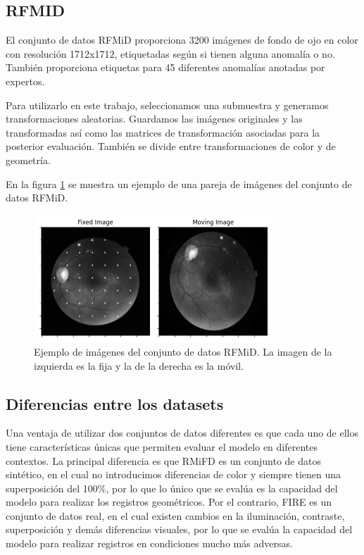 \subsection{RFMID}\label{subsec:RFMID}

El conjunto de datos RFMiD \cite{RFMiD} proporciona 3200 imágenes de fondo de ojo en color con resolución 1712x1712, etiquetadas según si tienen alguna anomalía o no.
También proporciona etiquetas para 45 diferentes anomalías anotadas por expertos.

Para utilizarlo en este trabajo, seleccionamos una submuestra y generamos transformaciones aleatorias. Guardamos las imágenes originales y las transformadas así como las matrices de transformación asociadas para la posterior evaluación.
También se divide entre transformaciones de color y de geometría.

En la figura \ref{fig:rfmid_ej} se muestra un ejemplo de una pareja de imágenes del conjunto de datos RFMiD.

\begin{figure}[tbp]
    \centering
    \includegraphics[width=0.8\textwidth]{imaxes/rfmid_ej.png}
    \caption{Ejemplo de imágenes del conjunto de datos RFMiD. La imagen de la izquierda es la fija y la de la derecha es la móvil.}
    \label{fig:rfmid_ej} 
\end{figure} 

\subsection{Diferencias entre los datasets}
\label{subsec:Diferencias entre os datasets}

Una ventaja de utilizar dos conjuntos de datos diferentes es que cada uno de ellos tiene características únicas que permiten evaluar el modelo en diferentes contextos.
La principal diferencia es que RMiFD es un conjunto de datos sintético, en el cual no introducimos diferencias de color y siempre tienen una superposición del 100\%, por lo que lo único que se evalúa es la capacidad del modelo para realizar los registros geométricos.
Por el contrario, FIRE es un conjunto de datos real, en el cual existen cambios en la iluminación, contraste, superposición y demás diferencias visuales, por lo que se evalúa la capacidad del modelo para realizar registros en condiciones mucho más adversas.

